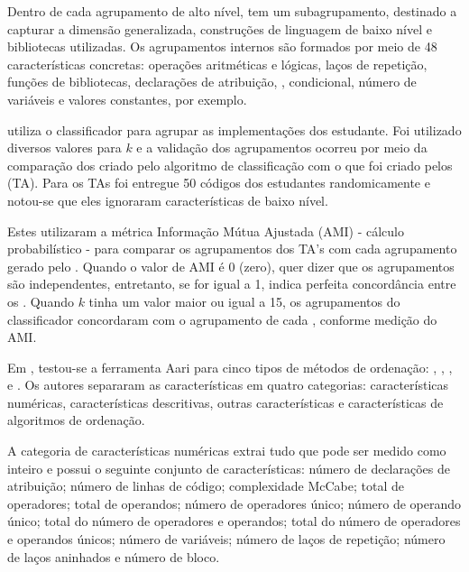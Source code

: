 	    Dentro de cada agrupamento de alto nível, tem um subagrupamento, destinado a
	    capturar a dimensão generalizada, construções de linguagem de baixo nível e
	    bibliotecas utilizadas. Os agrupamentos internos são formados por meio de 48
	    características concretas: operações aritméticas e lógicas, laços de repetição,
	    funções de bibliotecas, declarações de atribuição, , condicional,
	    número de variáveis e valores constantes, por exemplo.
	    
	     utiliza o classificador  para agrupar
	    as implementações dos estudante. Foi utilizado diversos valores para $k$
	    e a validação dos agrupamentos ocorreu por meio da comparação dos 
	    criado pelo algoritmo de classificação com o que foi criado pelos
	     (TA). Para os TAs foi entregue 50 códigos
	    dos estudantes randomicamente e notou-se que eles ignoraram características
	    de baixo nível.
	    
	    Estes utilizaram a métrica Informação Mútua Ajustada (AMI) - cálculo
	    probabilístico - para comparar os agrupamentos dos TA's com cada agrupamento
	    gerado pelo . Quando o valor de AMI é 0 (zero), quer dizer
	    que os agrupamentos são independentes, entretanto, se for igual a 1, indica
	    perfeita concordância entre os . Quando $k$ tinha um
	    valor maior ou igual a 15, os agrupamentos do classificador concordaram com
	    o agrupamento de cada , conforme medição do AMI.
	    
	    Em , testou-se a ferramenta Aari para cinco tipos
	    de métodos de ordenação: , ,
	    ,  e . Os autores
		separaram as características em quatro categorias: características numéricas,
		características descritivas, outras características e características de
		algoritmos de ordenação.
	    
	    A categoria de características numéricas extrai tudo que pode ser medido
	    como inteiro e possui o seguinte conjunto de características: número de
	    declarações de atribuição; número de linhas de código; complexidade McCabe;
		total de operadores; total de operandos; número de operadores único; número
		de operando único; total do número de operadores e operandos; total do número
		de operadores e operandos únicos; número de variáveis; número de laços de
	    repetição; número de laços aninhados e número de bloco.
	    
